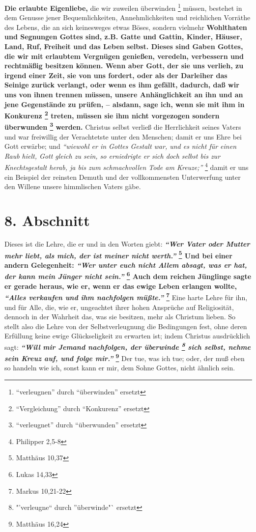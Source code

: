 \textbf{Die erlaubte Eigenliebe,} die wir zuweilen überwinden
\footnote{"`verleugnen"' durch "`überwinden"' ersetzt} müssen, bestehet in dem
Genusse jener Bequemlichkeiten, Annehmlichkeiten und reichlichen Vorräthe des
Lebens, die an sich keinesweges etwas Böses, sondern vielmehr \textbf{Wohlthaten
und
Segnungen Gottes sind, z.B. Gatte und Gattin, Kinder, Häuser, Land, Ruf,
Freiheit und das Leben selbst. Dieses sind Gaben Gottes, die wir mit erlaubtem
Vergnügen genießen, veredeln, verbessern und rechtmäßig besitzen können. Wenn
aber Gott, der sie uns verlieh, zu irgend einer Zeit, sie von uns fordert, oder
als der Darleiher das Seinige zurück verlangt, oder wenn es ihm gefällt,
dadurch, daß wir uns von ihnen trennen müssen, unsere Anhänglichkeit an ihn und
an jene Gegenstände zu prüfen, -- alsdann, sage ich, wenn sie mit ihm in
Konkurenz \footnote{"`Vergleichung"' durch "`Konkurenz"' ersetzt} treten, müssen
sie ihm nicht vorgezogen sondern überwunden \footnote{"`verleugnet"' durch
"`überwunden"' ersetzt} werden.}
Christus selbst verließ die Herrlichkeit seines Vaters und war freiwillig der
Verachtetste unter den Menschen; damit er uns Ehre bei Gott erwärbe; und
\textit{"`wiewohl er in Gottes Gestalt war, und es nicht für einen Raub hielt,
Gott
gleich zu sein, so erniedrigte er sich doch selbst bis zur Knechtsgestalt
herab, ja bis zum schmachvollen Tode am Kreuze;"'}
\footnote{Philipper 2,5-8}
damit er
uns ein Beispiel der reinsten Demuth und der vollkommensten Unterwerfung unter
den Willene unsere himmlischen Vaters gäbe.

\section{8. Abschnitt} \label{kap4_ab8}

Dieses ist die Lehre, die er und in den Worten giebt:
\textbf{
\textit{"`Wer Vater oder Mutter mehr liebt, als mich, der ist meiner nicht
werth."'}
\footnote{Matthäus  10,37}
Und bei einer andern Gelegenheit:
\textit{"`Wer unter euch nicht Allem absagt, was er hat, der kann mein Jünger
nicht sein."'}
\footnote{Lukas 14,33} Auch dem reichen
Jünglinge sagte er gerade heraus, wie er, wenn er das ewige Leben erlangen
wollte,
\textit{"`Alles verkaufen und ihm nachfolgen müßte."'}
\footnote{Markus 10,21-22}
}
Eine harte Lehre für ihn, und für Alle, die, wie er, ungeachtet ihrer hohen
Ansprüche auf Religiosität, dennoch in der Wahrheit das, was sie besitzen, mehr
als Christum lieben. So stellt also die Lehre von der Selbstverleugnung die
Bedingungen fest, ohne deren Erfüllung keine ewige Glückseligkeit zu erwarten
ist; indem Christus ausdrücklich sagt:
\textbf{
\textit{"`Will mir Jemand nachfolgen, der überwinde \footnote{"'verleugne"`
durch "'überwinde"` ersetzt} sich selbst, nehme sein Kreuz auf, und folge
mir."'}
\footnote{Matthäus 16,24}}
Der tue, was ich tue; oder, der muß eben so handeln wie ich, sonst kann
er mir, dem Sohne Gottes, nicht ähnlich sein.

